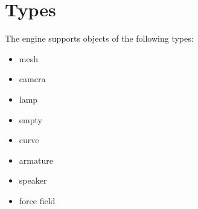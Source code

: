 \documentclass[a4paper,12pt,oneside]{sphinxmanual}
\begin{document}
\section{Types}
\label{objects:id2}
The engine supports objects of the following types:
\begin{itemize}
\item {} 
mesh

\item {} 
camera

\item {} 
lamp

\item {} 
empty

\item {} 
curve

\item {} 
armature

\item {} 
speaker

\item {} 
force field

\end{itemize}
\end{document}
